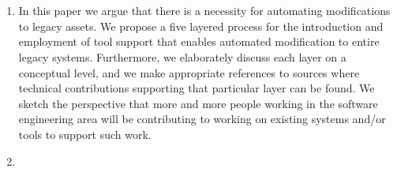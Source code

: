 

%
\cleardoublepage
{}


\chapter{}


\begin{englishtext}
\begin{enumerate}

    \item In this paper we argue that there is a necessity for automating
    modifications to legacy assets. We propose a five layered process for the
    introduction and employment of tool support that enables automated
    modification to entire legacy systems. Furthermore, we elaborately discuss
    each layer on a conceptual level, and we make appropriate references to
    sources where technical contributions supporting that particular layer can
    be found. We sketch the perspective that more and more people working in the
    software engineering area will be contributing to working on existing
    systems and/or tools to support such work. \cite{legacyAssets}

    \item

\end{enumerate}
\end{englishtext}


